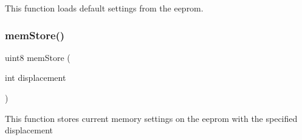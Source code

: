 This function loads default settings from the eeprom. \mbox{\label{command__processing_8h_ad37da1fb5c1ccf35a9a53595b8bab54c}} 
\subsubsection{mem\+Store()}
{\footnotesize\ttfamily uint8 mem\+Store (\begin{DoxyParamCaption}\item[{int}]{displacement }\end{DoxyParamCaption})}

This function stores current memory settings on the eeprom with the specified displacement 